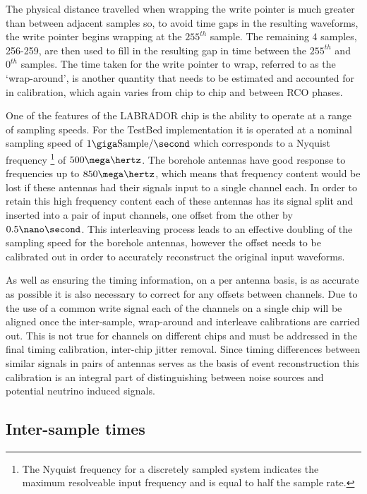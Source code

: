 The physical distance travelled when wrapping the write pointer is much greater than between adjacent samples so, to avoid time gaps in the resulting waveforms, the write pointer begins wrapping at the $255^{th}$ sample. The remaining 4 samples, 256-259, are then used to fill in the resulting gap in time between the $255^{th}$ and $0^{th}$ samples.  The time taken for the write pointer to wrap, referred to as the `wrap-around', is another quantity that needs to be estimated and accounted for in calibration, which again varies from chip to chip and between RCO phases.


One of the features of the LABRADOR chip is the ability to operate at a range of sampling speeds. For the TestBed implementation it is operated at a nominal sampling speed of $1 \giga \mbox{Sample} /\second$ which corresponds to a Nyquist frequency \footnote{The Nyquist frequency for a discretely sampled system indicates the maximum resolveable input frequency and is equal to half the sample rate.} of $500 \mega \hertz$. The borehole antennas have good response to frequencies up to $850 \mega \hertz$, which means that frequency content would be lost if these antennas had their signals input to a single channel each. In order to retain this high frequency content each of these antennas has its signal split and inserted into a pair of input channels, one offset from the other by $0.5 \nano \second$. This interleaving process leads to an effective doubling of the sampling speed for the borehole antennas, however the offset needs to be calibrated out in order to accurately reconstruct the original input waveforms. 

As well as ensuring the timing information, on a per antenna basis, is as accurate as possible it is also necessary to correct for any offsets between channels. Due to the use of a common write signal each of the channels on a single chip will be aligned once the inter-sample, wrap-around and interleave calibrations are carried out. This is not true for channels on different chips and must be addressed in the final timing calibration, inter-chip jitter removal. Since timing differences between similar signals in pairs of antennas serves as the basis of event reconstruction this calibration is an integral part of distinguishing between noise sources and potential neutrino induced signals. 

\subsection{Inter-sample times}
\label{sec:calibration:LABRADOR-Digitiser-Chip:Inter-sample-times}

